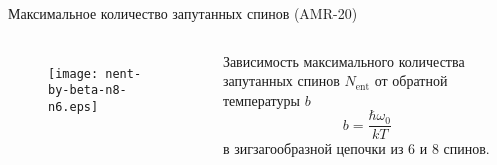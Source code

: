 \begin{frame}{Максимальное количество запутанных спинов (AMR-20)}
  \begin{columns}

     \begin{figure}
     \texttt{[image: nent-by-beta-n8-n6.eps]}
     \end{figure}

     Зависимость максимального количества запутанных спинов $N_\mathrm{ent}$ от обратной температуры $b$
     $$ b=\dfrac{\hbar\omega_0}{kT} $$
     в зигзагообразной цепочки из 6 и 8 спинов.

  \end{columns}
\end{frame}
